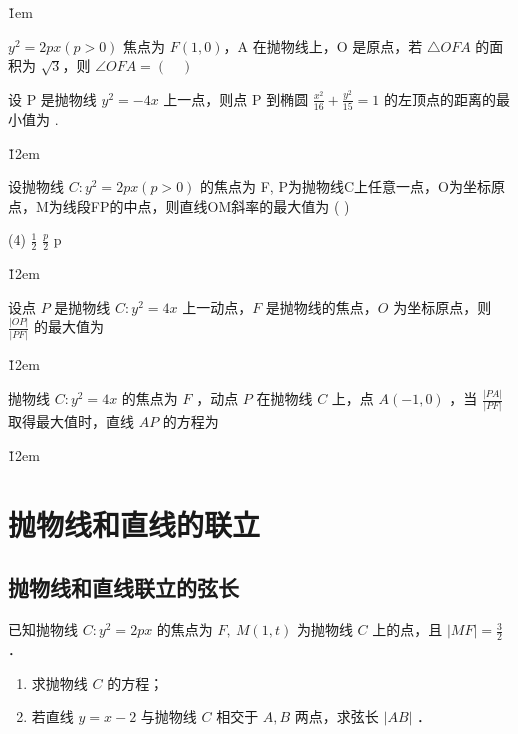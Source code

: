 \v{1em}

\begin{problem}
$y^2=2px(p>0)$ 焦点为 $F(1,0)$，A 在抛物线上，O 是原点，若 $\triangle OFA$ 的面积为 $\sqrt{3}$，则 $\angle OFA = ( \quad )$
\end{problem}

\vspace{12em}

\begin{problem}
设 P 是抛物线 $y^2=-4 x$ 上一点，则点 P 到椭圆 $\frac{x^2}{16}+\frac{y^2}{15}=1$ 的左顶点的距离的最小值为 \underline{\hspace{2em}}.
\end{problem}

\v{12em}

\begin{problem}
设抛物线 $C: y^2=2px(p>0)$ 的焦点为 F, P为抛物线C上任意一点，O为坐标原点，M为线段FP的中点，则直线OM斜率的最大值为 ( \quad )
\begin{tasks}(4)
    \task $\frac{1}{2}$
    \task $\frac{p}{2}$
    \task p
\end{tasks}
\end{problem}

\v{12em}

\begin{example}
    设点 $P$ 是抛物线 $C: y^2=4 x$ 上一动点，$F$ 是抛物线的焦点，$O$ 为坐标原点，则 $\frac{|O P|}{|P F|}$ 的最大值为 $\qquad$
\end{example}

\v{12em}

\begin{example}
    抛物线 $C: y^2=4 x$ 的焦点为 $F$ ，动点 $P$ 在抛物线 $C$ 上，点 $A(-1,0)$ ，当 $\frac{|P A|}{|P F|}$ 取得最大值时，直线 $A P$ 的方程为 $\qquad$
\end{example}

\v{12em}

\section{抛物线和直线的联立}

\subsection{抛物线和直线联立的弦长}

\begin{example}
    已知抛物线 $C: y^2=2 p x$ 的焦点为 $F, ~ M(1, t)$ 为抛物线 $C$ 上的点，且 $|M F|=\frac{3}{2}$ ．
    \begin{enumerate}
        \item 求抛物线 $C$ 的方程；
        \item 若直线 $y=x-2$ 与抛物线 $C$ 相交于 $A, B$ 两点，求弦长 $|A B|$ ．
    \end{enumerate}
\end{example}

